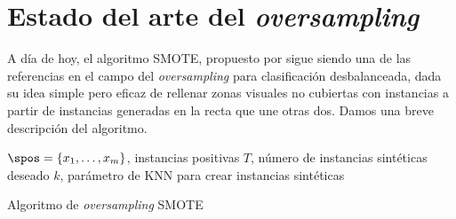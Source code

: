 
\section{Estado del arte del \textit{oversampling}}
A día de hoy, el algoritmo SMOTE, propuesto por \citealt{chawla02} sigue siendo una de las referencias en el campo del 
\textit{oversampling} para clasificación desbalanceada, dada su idea simple pero eficaz de rellenar zonas visuales no 
cubiertas con instancias a partir de instancias generadas en la recta que une otras dos. Damos una breve descripción
del algoritmo.

\begin{algorithm}[H]
\begin{algorithmic}[1]
  \REQUIRE $\spos = \{x_1, \ldots, x_m\}$, instancias positivas
  \REQUIRE $T$, número de instancias sintéticas deseado
  \REQUIRE $k$, parámetro de KNN para crear instancias sintéticas
  \NEWLINE
    \ENDFOR
  \ENDFOR
  \NEWLINE
\end{algorithmic}
\caption{Algoritmo de \textit{oversampling} SMOTE}
\label{alg:smote}
\end{algorithm}
